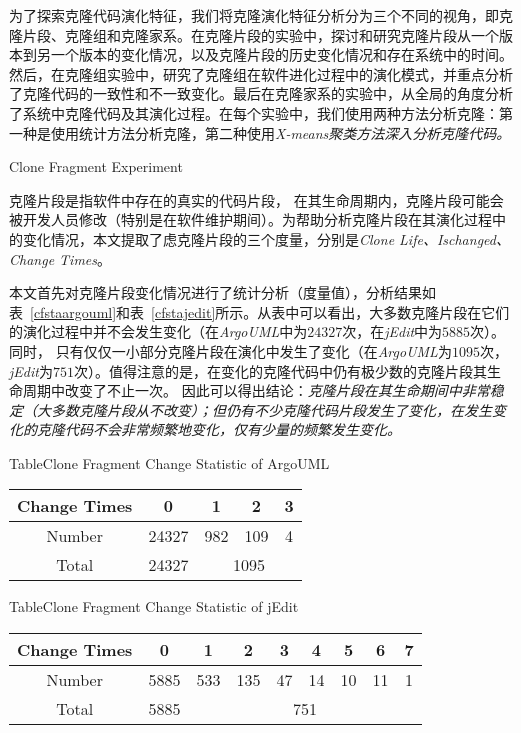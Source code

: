 为了探索克隆代码演化特征，我们将克隆演化特征分析分为三个不同的视角，即克隆片段、克隆组和克隆家系。在克隆片段的实验中，探讨和研究克隆片段从一个版本到另一个版本的变化情况，以及克隆片段的历史变化情况和存在系统中的时间。 然后，在克隆组实验中，研究了克隆组在软件进化过程中的演化模式，并重点分析了克隆代码的一致性和不一致变化。最后在克隆家系的实验中，从全局的角度分析了系统中克隆代码及其演化过程。在每个实验中，我们使用两种方法分析克隆：第一种是使用统计方法分析克隆，第二种使用\em{X-means}聚类方法深入分析克隆代码。

{Clone Fragment Experiment}

克隆片段是指软件中存在的真实的代码片段， 在其生命周期内，克隆片段可能会被开发人员修改（特别是在软件维护期间）。为帮助分析克隆片段在其演化过程中的变化情况，本文提取了虑克隆片段的三个度量，分别是{\em Clone Life、Ischanged、Change Times}。 

本文首先对克隆片段变化情况进行了统计分析（度量值），分析结果如表~\ref{cfstaargouml}和表~\ref{cfstajedit}所示。从表中可以看出，大多数克隆片段在它们的演化过程中并不会发生变化（在{\em ArgoUML}中为$24327$次，在{\em  jEdit}中为$5885$次）。同时， 只有仅仅一小部分克隆片段在演化中发生了变化（在{\em  ArgoUML}为$1095$次，{\em jEdit}为$751$次）。值得注意的是，在变化的克隆代码中仍有极少数的克隆片段其生命周期中改变了不止一次。 因此可以得出结论：{\em 克隆片段在其生命期间中非常稳定（大多数克隆片段从不改变）；但仍有不少克隆代码片段发生了变化，在发生变化的克隆代码不会非常频繁地变化，仅有少量的频繁发生变化。}

\begin{table}[htbp]
{Table$\!$}{Clone Fragment  Change Statistic of ArgoUML}
\vspace{0.5em}
\centering
\wuhao
\begin{tabular}{ccccc}
\toprule[1.5pt]
Change Times&0&1&2&3\\ 
\midrule[1pt]
Number&24327&982&109&4\\ 
Total&24327&\multicolumn{3}{c}{1095} \\
\bottomrule[1.5pt]
\end{tabular}
\end{table}

\begin{table}[htbp]
{Table$\!$}{Clone Fragment Change Statistic of jEdit}
\vspace{0.5em}
\centering
\wuhao
\begin{tabular}{ccccccccc}
\toprule[1.5pt]
Change Times &0&1&2&3&4&5&6&7\\ 
\midrule[1pt]
Number&5885&533&135&47&14&10&11&1\\ 
Total&5885&\multicolumn{7}{c}{751}   \\ 
\bottomrule[1.5pt]
\end{tabular}
\end{table}

